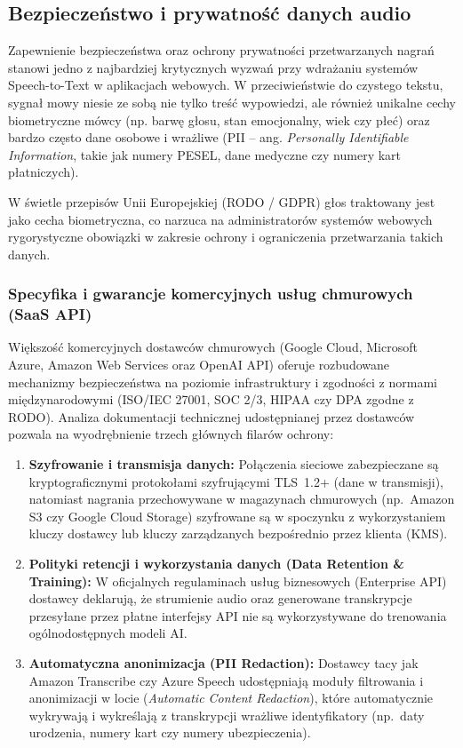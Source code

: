 \subsection{Bezpieczeństwo i prywatność danych audio}
\label{subsec:security_privacy}

Zapewnienie bezpieczeństwa oraz ochrony prywatności przetwarzanych nagrań stanowi jedno z najbardziej krytycznych wyzwań przy wdrażaniu systemów Speech-to-Text w aplikacjach webowych. W przeciwieństwie do czystego tekstu, sygnał mowy niesie ze sobą nie tylko treść wypowiedzi, ale również unikalne cechy biometryczne mówcy (np. barwę głosu, stan emocjonalny, wiek czy płeć) oraz bardzo często dane osobowe i wrażliwe (PII -- ang. \textit{Personally Identifiable Information}, takie jak numery PESEL, dane medyczne czy numery kart płatniczych).

W świetle przepisów Unii Europejskiej (RODO / GDPR) głos traktowany jest jako cecha biometryczna, co narzuca na administratorów systemów webowych rygorystyczne obowiązki w zakresie ochrony i ograniczenia przetwarzania takich danych.

\subsubsection{Specyfika i gwarancje komercyjnych usług chmurowych (SaaS API)}

Większość komercyjnych dostawców chmurowych (Google Cloud, Microsoft Azure, Amazon Web Services oraz OpenAI API) oferuje rozbudowane mechanizmy bezpieczeństwa na poziomie infrastruktury i zgodności z normami międzynarodowymi (ISO/IEC 27001, SOC 2/3, HIPAA czy DPA zgodne z RODO). Analiza dokumentacji technicznej udostępnianej przez dostawców pozwala na wyodrębnienie trzech głównych filarów ochrony:

\begin{enumerate}
    \item \textbf{Szyfrowanie i transmisja danych:} Połączenia sieciowe zabezpieczane są kryptograficznymi protokołami szyfrującymi TLS~1.2+ (dane w transmisji), natomiast nagrania przechowywane w magazynach chmurowych (np.~Amazon S3 czy Google Cloud Storage) szyfrowane są w spoczynku z wykorzystaniem kluczy dostawcy lub kluczy zarządzanych bezpośrednio przez klienta (KMS).
    \item \textbf{Polityki retencji i wykorzystania danych (Data Retention \& Training):} W oficjalnych regulaminach usług biznesowych (Enterprise API) dostawcy deklarują, że strumienie audio oraz generowane transkrypcje przesyłane przez płatne interfejsy API nie są wykorzystywane do trenowania ogólnodostępnych modeli AI.
    \item \textbf{Automatyczna anonimizacja (PII Redaction):} Dostawcy tacy jak Amazon Transcribe czy Azure Speech udostępniają moduły filtrowania i anonimizacji w locie (\textit{Automatic Content Redaction}), które automatycznie wykrywają i wykreślają z transkrypcji wrażliwe identyfikatory (np.~daty urodzenia, numery kart czy numery ubezpieczenia).
\end{enumerate}


